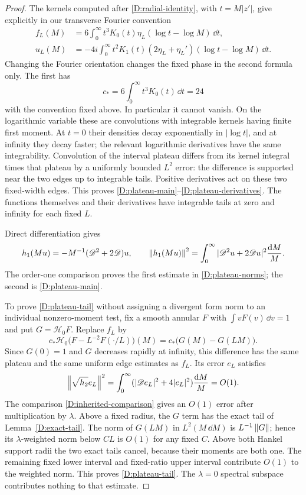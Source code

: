 \begin{proof}
The kernels computed after \eqref{D:radial-identity}, with
$t=M|z'|$, give explicitly in our transverse Fourier convention
\begin{align}
 f_L(M)&=6\int_0^\infty t^3K_0(t)
     \eta_L(\log t-\log M)\,\dd t,\label{D:f-convolution}\\
 u_L(M)&=-4i\int_0^\infty t^2K_1(t)
     (2\eta_L+\eta_L')(\log t-\log M)\,\dd t.
 \label{D:u-convolution}
\end{align}
Changing the Fourier orientation changes the fixed phase in the
second formula only.  The first has
\[
 c_*=6\int_0^\infty t^3K_0(t)\,\dd t=24
\]
with the convention fixed above.  In particular it cannot vanish.
On the logarithmic variable these are convolutions with integrable
kernels having finite first moment.  At $t=0$ their densities
decay exponentially in $|\log t|$, and at infinity they decay
faster; the relevant logarithmic derivatives have the same
integrability.  Convolution of the interval plateau differs from
its kernel integral times that plateau by a uniformly bounded
$L^2$ error: the difference is supported near the two edges up
to integrable tails.  Positive derivatives act on these two
fixed-width edges.  This proves
\eqref{D:plateau-main}--\eqref{D:plateau-derivatives}.
The functions themselves and their derivatives have integrable
tails at zero and infinity for each fixed $L$.

Direct differentiation gives
\[
 h_1(Mu)=-M^{-1}(\mathscr D^2+2\mathscr D)u,
 \qquad
 \left\lVert h_1(Mu)\right\rVert^2=
 \int_0^\infty|\mathscr D^2u+2\mathscr Du|^2\frac{\mathrm d M}{M}.
\]
The order-one comparison proves the first estimate in
\eqref{D:plateau-norms}; the second is
\eqref{D:plateau-main}.

To prove \eqref{D:plateau-tail} without assigning a divergent
form norm to an individual nonzero-moment test, fix a smooth
annular $F$ with $\int vF(v)\,\dd v=1$ and put $G=\mathcal H_0F$.
Replace $f_L$ by
\[
 c_*\mathcal H_0\bigl(F-L^{-2}F(\cdot/L)\bigr)(M)
 =c_*\bigl(G(M)-G(LM)\bigr).
\]
Since $G(0)=1$ and $G$ decreases rapidly at infinity, this
difference has the same plateau and the same uniform edge
estimates as $f_L$.  Its error $e_L$ satisfies
\[
 \left\lVert\sqrt{h_2}e_L\right\rVert^2
 =\int_0^\infty
 (|\mathscr De_L|^2+4|e_L|^2)\frac{\mathrm d M}{M}=O(1).
\]
The comparison \eqref{D:inherited-comparison} gives an $O(1)$
error after multiplication by $\lambda$.  Above a fixed radius,
the $G$ term has the exact tail of Lemma~\ref{D:exact-tail}.
The norm of $G(LM)$ in $L^2(M\,\dd M)$ is $L^{-1}\left\lVert G\right\rVert$;
hence its $\lambda$-weighted norm below $CL$ is $O(1)$ for
any fixed $C$.  Above both Hankel support radii the two exact
tails cancel, because their moments are both one.  The remaining
fixed lower interval and fixed-ratio upper interval contribute
$O(1)$ to the weighted norm.  This proves
\eqref{D:plateau-tail}.  The $\lambda=0$ spectral subspace
contributes nothing to that estimate.


\end{proof}
